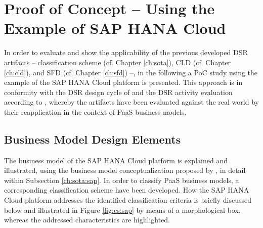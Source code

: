 \chapter{Proof of Concept -- Using the Example of SAP HANA Cloud}\label{ch:poc}

In order to evaluate and show the applicability of the previous developed \ac{DSR} artifacts -- classification scheme (cf. Chapter \ref{ch:sota}), \ac{CLD} (cf. Chapter \ref{ch:cld}), and \ac{SFD} (cf. Chapter \ref{ch:sfd}) --, in the following a \acf{PoC} study using the example of the SAP HANA Cloud platform is presented. This approach is in conformity with the \ac{DSR} design cycle of \citet[pp. 88,90-91]{Hevner2007} and the \ac{DSR} activity evaluation according to \citet[p. 56]{Peffers2007}, whereby the artifacts have been evaluated against the real world by their reapplication in the context of \ac{PaaS} business models.

\section{Business Model Design Elements}\label{ch:poc:cs}

The business model of the SAP HANA Cloud platform is explained and illustrated, using the business model conceptualization proposed by \citet{Johnson2008}, in detail within Subsection \ref{ch:sota:sap}. In order to classify \ac{PaaS} business models, a corresponding classification scheme have been developed. How the SAP HANA Cloud platform addresses the identified classification criteria is briefly discussed below and illustrated in Figure \ref{fig:cs:sap} by means of a morphological box, whereas the addressed characteristics are highlighted.

